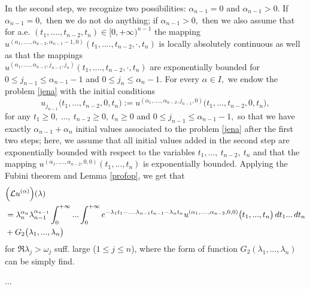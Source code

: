 \documentclass{amsart}
\theoremstyle{definition}
\theoremstyle{remark}
\numberwithin{equation}{section}
\begin{document}
In the second step, we recognize two possibilities: $\alpha_{n-1}=0$ and $\alpha_{n-1}>0.$ If $\alpha_{n-1}=0,$ then we do not do anything; if $\alpha_{n-1}>0,$ then we also assume
that for a.e. $(t_{1},....,t_{n-2},t_{n})\in [0,+\infty)^{n-1}$ the mapping $u^{(\alpha_{1},....,\alpha_{n-2},\alpha_{n-1}-1,0)}(t_{1},....,t_{n-2},\cdot,t_{n})$ is locally absolutely continuous as well as that the mappings\\ $u^{(\alpha_{1},....,\alpha_{n-1},j_{n-1},j_{n})}(t_{1},....,t_{n-2},\cdot,t_{n})$ are exponentially bounded for $0\leq j_{n-1}\leq \alpha_{n-1}-1$ and $0\leq j_{n}\leq \alpha_{n}-1.$ For every $\alpha \in I,$ we endow the problem \eqref{jena} with the initial conditions
$$
u_{j_{n-1}}\bigl( t_{1},...,t_{n-2},0,t_{n}\bigr) := u^{(\alpha_{1},....,\alpha_{n-2},j_{n-1},0)}\bigl( t_{1},...,t_{n-2},0,t_{n}\bigr), 
$$
for any $ t_{1}\geq 0,\ ...,\ t_{n-2}\geq 0,\ t_{n}\geq 0 $ and $0\leq j_{n-1}\leq \alpha_{n-1}-1,$ so that we have exactly $\alpha_{n-1}+\alpha_{n}$ initial values associated to the problem \eqref{jena} after the first two steps; here, we assume that all  initial values added in the second step are exponentially bounded with respect to the variables $t_{1},...,\ t_{n-2},\ t_{n} $ and that the mapping $u^{(\alpha_{1},....,\alpha_{n-2},0,0)} ( t_{1},...,t_{n} )$ is exponentially bounded. Applying the Fubini theorem and Lemma \ref{profop}, we get that
\begin{align*} &
\Bigl({\mathcal L}u^{(\alpha)}\Bigr)(\lambda)
\\&=\lambda_{n}^{\alpha_{n}}\lambda_{n-1}^{\alpha_{n-1}}\int^{+\infty}_{0}... \int^{+\infty}_{0}e^{-\lambda_{1}t_{1}-....\lambda_{n-1}t_{n-1}-\lambda_{n}t_{n}}u^{(\alpha_{1},....,\alpha_{n-2},0,0)}\bigl( t_{1},...,t_{n}\bigr) \, dt_{1}...\, dt_{n}
\\&+G_{2}\bigl( \lambda_{1},...,\lambda_{n}\bigr)
\end{align*}
for $\Re \lambda_{j}>\omega_{j}$ suff. large ($1\leq j\leq n$), where the form of function $ G_{2}( \lambda_{1},...,\lambda_{n})$
can be simply find.

...
\end{document}
